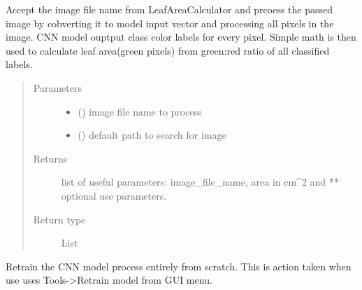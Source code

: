 \documentclass[letterpaper,10pt,english]{sphinxmanual}
\begin{document}

\begin{fulllineitems}
\label{\detokenize{basefunctions:basefunctions.PROCESS_IMAGE}}
Accept the image file name from LeafAreaCalculator and prcoess the passed image by cobverting it to model input vector and processing all pixels in the image.
CNN model ouptput class color labels for every pixel. Simple math is then used to calculate leaf area(green pixels) from green:red ratio of all classified labels.
\begin{quote}\begin{description}
\item[{Parameters}] \leavevmode\begin{itemize}
\item {} 
 () \textendash{} image file name to process

\item {} 
 () \textendash{} default path to search for image

\end{itemize}

\item[{Returns}] \leavevmode
list of useful parameters: image\_file\_name, area in cm\textasciicircum{}2 and ** optional use parameters.

\item[{Return type}] \leavevmode
List

\end{description}\end{quote}

\end{fulllineitems}


\begin{fulllineitems}
\label{\detokenize{basefunctions:basefunctions.RETRAIN_MODEL_FROM_SCRATCH}}
Retrain the CNN model process entirely from scratch. This is action taken when use uses Tools-\textgreater{}Retrain model from GUI menu.

\end{fulllineitems}
\end{document}
